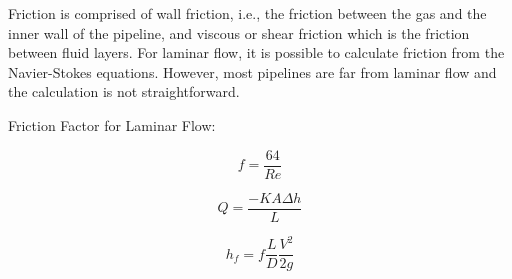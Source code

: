 \documentclass{article}
\begin{document}
	Friction is comprised of wall friction, i.e., the friction between the gas and the inner wall of the pipeline, and viscous or shear friction which is the friction between fluid layers. For laminar flow, it is possible to calculate friction from the Navier-Stokes equations. However, most pipelines are far from laminar flow and the calculation is not straightforward. 
	
	
	Friction Factor for Laminar Flow:
	
	\begin{equation}
		f = \frac{64}{Re}
		\label{eq:friction_factor_laminar}
	\end{equation}
	
	
	\begin{equation}
		Q = \frac{-KA \Delta h}{L}
		\label{eq:darcy_equation}
	\end{equation}
	
	\begin{equation}
		h_f = f \frac{L}{D} \frac{V^2}{2g}
		\label{eq:darcy_weisbach}
	\end{equation}
	
	
	
	
	
	
\end{document}
